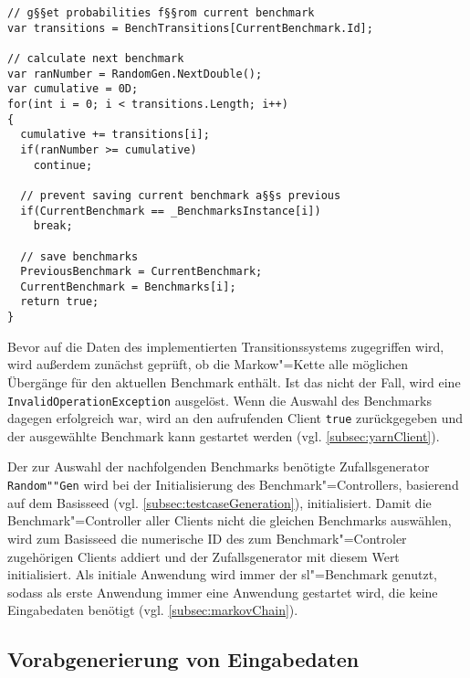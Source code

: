 \begin{lstlisting}[label=lst:benchmarkChanging,style=cs,
caption={[Auswahl des nachfolgenden Benchmarks]
    Auswahl des nachfolgenden Benchmarks (gekürzt).
    Dies stellt einen Ausschnitt der Methode \texttt{ChangeBenchmark()} dar, welche vom Client zur Bestimmung des nachfolgenden Benchmarks aufgerufen wird (vgl. \cref{subsec:yarnClient}).}]
// g§§et probabilities f§§rom current benchmark
var transitions = BenchTransitions[CurrentBenchmark.Id];

// calculate next benchmark
var ranNumber = RandomGen.NextDouble();
var cumulative = 0D;
for(int i = 0; i < transitions.Length; i++)
{
  cumulative += transitions[i];
  if(ranNumber >= cumulative)
    continue;
  
  // prevent saving current benchmark a§§s previous
  if(CurrentBenchmark == _BenchmarksInstance[i])
    break;
  
  // save benchmarks
  PreviousBenchmark = CurrentBenchmark;
  CurrentBenchmark = Benchmarks[i];
  return true;
}
\end{lstlisting}

Bevor auf die Daten des implementierten Transitionssystems zugegriffen wird, wird außerdem zunächst geprüft, ob die Markow"=Kette alle möglichen Übergänge für den aktuellen Benchmark enthält.
Ist das nicht der Fall, wird eine \texttt{InvalidOperationException} ausgelöst.
Wenn die Auswahl des Benchmarks dagegen erfolgreich war, wird an den aufrufenden Client \texttt{true} zurückgegeben und der ausgewählte Benchmark kann gestartet werden (vgl. \cref{subsec:yarnClient}).

Der zur Auswahl der nachfolgenden Benchmarks benötigte Zufallsgenerator \texttt{Random""Gen} wird bei der Initialisierung des Benchmark"=Controllers, basierend auf dem Basisseed (vgl. \cref{subsec:testcaseGeneration}), initialisiert.
Damit die Benchmark"=Controller aller Clients nicht die gleichen Benchmarks auswählen, wird zum Basisseed die numerische ID des zum Benchmark"=Controler zugehörigen Clients addiert und der Zufallsgenerator mit diesem Wert initialisiert.
Als initiale Anwendung wird immer der \acrlong{sl}"=Benchmark genutzt, sodass als erste Anwendung immer eine Anwendung gestartet wird, die keine Eingabedaten benötigt (vgl. \cref{subsec:markovChain}).

\subsection{Vorabgenerierung von Eingabedaten}
\label{subsec:precreateInputData}

